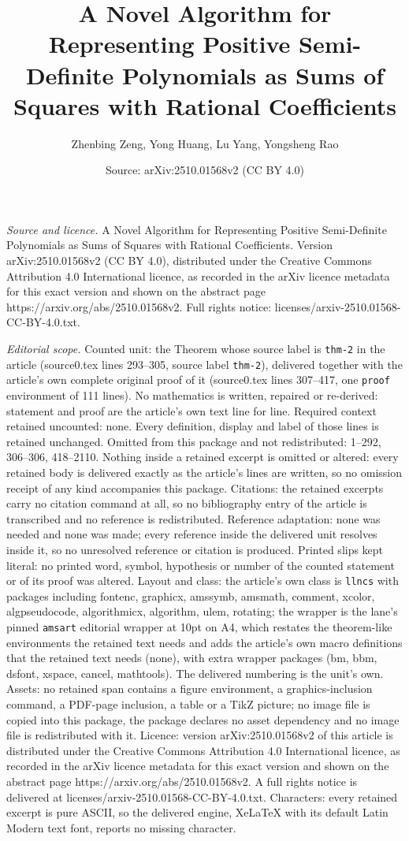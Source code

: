 \documentclass[10pt,a4paper]{amsart}
\title[A Novel Algorithm for Representing Positive Semi-Definite Po]{A Novel Algorithm for Representing Positive Semi-Definite Polynomials as Sums of Squares with Rational Coefficients}
\author{Zhenbing Zeng, Yong Huang, Lu Yang, Yongsheng Rao}
\date{Source: arXiv:2510.01568v2 (CC BY 4.0)}
\begin{document}
\maketitle

\noindent\emph{Source and licence.} A Novel Algorithm for Representing Positive Semi-Definite Polynomials as Sums of Squares with Rational Coefficients. Version arXiv:2510.01568v2 (CC BY 4.0), distributed under the Creative Commons Attribution 4.0 International licence, as recorded in the arXiv licence metadata for this exact version and shown on the abstract page https://arxiv.org/abs/2510.01568v2. Full rights notice: licenses/arxiv-2510.01568-CC-BY-4.0.txt.\par\smallskip

\noindent\textit{Editorial scope.} Counted unit: the Theorem whose source label is \texttt{thm-2} in the article (source0.tex lines 293--305, source label \texttt{thm-2}), delivered together with the article's own complete original proof of it (source0.tex lines 307--417, one \texttt{proof} environment of 111 lines). No mathematics is written, repaired or re-derived: statement and proof are the article's own text line for line. Required context retained uncounted: none. Every definition, display and label of those lines is retained unchanged. Omitted from this package and not redistributed: 1--292, 306--306, 418--2110. Nothing inside a retained excerpt is omitted or altered: every retained body is delivered exactly as the article's lines are written, so no omission receipt of any kind accompanies this package. Citations: the retained excerpts carry no citation command at all, so no bibliography entry of the article is transcribed and no reference is redistributed. Reference adaptation: none was needed and none was made; every reference inside the delivered unit resolves inside it, so no unresolved reference or citation is produced. Printed slips kept literal: no printed word, symbol, hypothesis or number of the counted statement or of its proof was altered. Layout and class: the article's own class is \texttt{llncs} with packages including fontenc, graphicx, amssymb, amsmath, comment, xcolor, algpseudocode, algorithmicx, algorithm, ulem, rotating; the wrapper is the lane's pinned \texttt{amsart} editorial wrapper at 10pt on A4, which restates the theorem-like environments the retained text needs and adds the article's own macro definitions that the retained text needs (none), with extra wrapper packages (bm, bbm, dsfont, xspace, cancel, mathtools). The delivered numbering is the unit's own. Assets: no retained span contains a figure environment, a graphics-inclusion command, a PDF-page inclusion, a table or a TikZ picture; no image file is copied into this package, the package declares no asset dependency and no image file is redistributed with it. Licence: version arXiv:2510.01568v2 of this article is distributed under the Creative Commons Attribution 4.0 International licence, as recorded in the arXiv licence metadata for this exact version and shown on the abstract page https://arxiv.org/abs/2510.01568v2. A full rights notice is delivered at licenses/arxiv-2510.01568-CC-BY-4.0.txt. Characters: every retained excerpt is pure ASCII, so the delivered engine, XeLaTeX with its default Latin Modern text font, reports no missing character.
\end{document}
